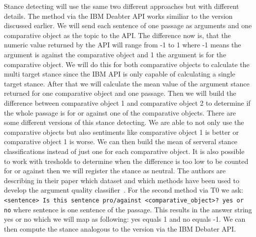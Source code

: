         Stance detecting will use the same two different approaches but with different details. The method via the IBM Deabter API works similiar to the version discussed earlier. We will send each sentence of one passage as arguments and one comparative object as the topic to the API. The difference now is, that the  numeric value returned by the API will range from -1 to 1 where -1 means the argument  is against the comparative object and 1 the argument is for the comparative object. We will do this for both comparative objects to calculate the multi target stance since the IBM API is only capable of calculating a single target stance. After that we will calculate the mean value of the argument stance returned for one comparative object and one passage. Then we will build the difference between comparative object 1 and comparative object 2 to determine if the whole passage is for or against one of the comparative objects. There are some different versions of this stance detecting. We are able to not only use the comparative objects but also sentiments like comparative object 1 is better or comparative object 1 is worse. We can then build the mean of serveral stance classifications instead of just one for each comparative object. It is also possible to work with tresholds to determine when the difference is too low to be counted for or against then we will register the stance as neutral.  The authors \citeauthor{BarHaimBDSS2017} are describing in their paper which dataset and which methods have been used to develop the argument quality classifier~\cite{BarHaimBDSS2017}. For the second method via T0 we ask: \texttt{<sentence> Is this sentence pro/against <comparative\_object>? yes or no} where sentence is one sentence of the passage. This results in the answer string yes or no which we will map as following: yes equals 1 and no equals -1. We can then compute the stance analogous to the version via the IBM Debater API.
